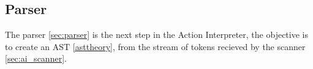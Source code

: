\subsection{Parser}
The parser \ref{sec:parser} is the next step in the Action Interpreter, the objective is to create an AST \ref{asttheory}, from the stream of tokens recieved by the scanner \ref{sec:ai_scanner}.\\
